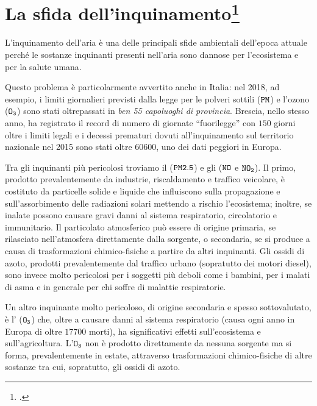 \section[La sfida dell'inquinamento]{La sfida dell'inquinamento\footcite[I dati
forniti in questo paragrafo sono prelevati da][]{legambiente2019}}

L'inquinamento dell'aria è una delle principali sfide ambientali dell'epoca
attuale perché le sostanze inquinanti presenti nell'aria sono dannose per
l'ecosistema e per la salute umana.

Questo problema è particolarmente avvertito anche in Italia: nel 2018, ad
esempio, i limiti giornalieri previsti dalla legge per le polveri sottili
(\(\mathtt{PM}\)) e l'ozono (\(\mathtt{O_3}\)) sono stati oltrepassati in \emph{ben
55 capoluoghi di provincia}. Brescia, nello stesso anno, ha registrato il record
di numero di giornate ``fuorilegge'' con \(150\) giorni oltre i limiti legali e
i decessi prematuri dovuti all'inquinamento sul territorio nazionale nel 2015
sono stati oltre \(60600\), uno dei dati peggiori in Europa.

Tra gli inquinanti più pericolosi troviamo il  (\(\mathtt{PM2.5}\)) e gli  (\(\mathtt{NO}\) e
\(\mathtt{NO_2}\)). Il primo, prodotto prevalentemente da industrie, riscaldamento
e traffico veicolare, è costituto da particelle solide e liquide che influiscono
sulla propagazione e sull'assorbimento delle radiazioni solari mettendo a
rischio l'ecosistema; inoltre, se inalate possono causare gravi danni al sistema
respiratorio, circolatorio e immunitario. Il particolato atmosferico può essere
di origine primaria, se rilasciato nell'atmosfera direttamente dalla sorgente, o
secondaria, se si produce a causa di trasformazioni chimico-fisiche a partire da
altri inquinanti. Gli ossidi di azoto, prodotti prevalentemente dal traffico
urbano (sopratutto dei motori diesel), sono invece molto pericolosi per i
soggetti più deboli come i bambini, per i malati di asma e in generale per chi
soffre di malattie respiratorie.

Un altro inquinante molto pericoloso, di origine secondaria e spesso
sottovalutato, è l' (\(\mathtt{O_3}\)) che, oltre a
causare danni al sistema respiratorio (causa ogni anno in Europa di oltre
\(17700\) morti), ha significativi effetti sull'ecosistema e sull'agricoltura.
L'\(\mathtt{O_3}\) non è prodotto direttamente da nessuna sorgente ma si forma,
prevalentemente in estate, attraverso trasformazioni chimico-fisiche di altre
sostanze tra cui, sopratutto, gli ossidi di azoto.

